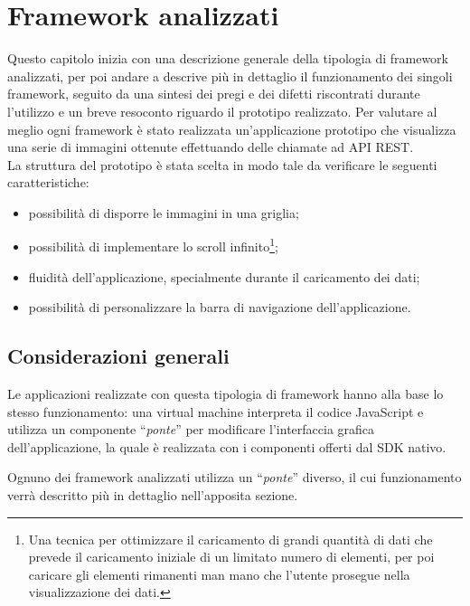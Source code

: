 
\chapter{Framework analizzati}
\label{cap:framework-analizzati}
Questo capitolo inizia con una descrizione generale della tipologia di framework analizzati, per poi andare a descrive più in dettaglio il funzionamento dei singoli framework, seguito da una sintesi dei pregi e dei difetti riscontrati durante l'utilizzo e un breve resoconto riguardo il prototipo realizzato.
Per valutare al meglio ogni framework è stato realizzata un'applicazione prototipo che visualizza una serie di immagini ottenute effettuando delle chiamate ad \gls{API} \gls{REST}.\\
La struttura del prototipo è stata scelta in modo tale da verificare le seguenti caratteristiche:
\begin{itemize}
\item possibilità di disporre le immagini in una griglia;
\item possibilità di implementare lo scroll infinito\footnote{Una tecnica per ottimizzare il caricamento di grandi quantità di dati che prevede il caricamento iniziale di un limitato numero di elementi, per poi caricare gli elementi rimanenti man mano che l'utente prosegue nella visualizzazione dei dati.};
\item fluidità dell'applicazione, specialmente durante il caricamento dei dati;
\item possibilità di personalizzare la barra di navigazione dell'applicazione.
\end{itemize}

\section{Considerazioni generali}
Le applicazioni realizzate con questa tipologia di framework hanno alla base lo stesso funzionamento: una \gls{virtual machine} interpreta il codice JavaScript e utilizza un componente ``\textit{ponte}'' per modificare l'interfaccia grafica dell'applicazione, la quale è realizzata con i componenti offerti dal \gls{SDK} nativo.

Ognuno dei framework analizzati utilizza un ``\textit{ponte}'' diverso, il cui funzionamento verrà descritto più in dettaglio nell'apposita sezione.

